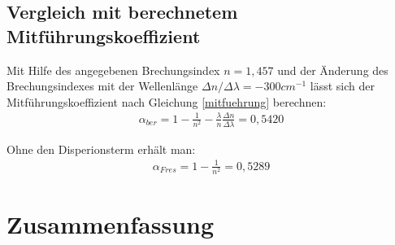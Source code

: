 \documentclass[12pt]{article}
\begin{document}
\subsection{Vergleich mit berechnetem Mitführungskoeffizient}
Mit Hilfe des angegebenen Brechungsindex $n=1,457$ und der Änderung des Brechungsindexes mit der Wellenlänge $\Delta n / \Delta\lambda = -300 cm^{-1}$
lässt sich der Mitführungskoeffizient nach Gleichung \ref{mitfuehrung} berechnen:
\begin{align}
 \alpha_{ber} = 1 - \frac{1}{n^2} - \frac{\lambda}{n} \frac{\Delta n}{\Delta \lambda} = 0,5420
\end{align}

Ohne den Disperionsterm erhält man:
\begin{align}
 \alpha_{Fres} = 1 - \frac{1}{n^2} = 0,5289
\end{align}

\section{Zusammenfassung}
\end{document}

